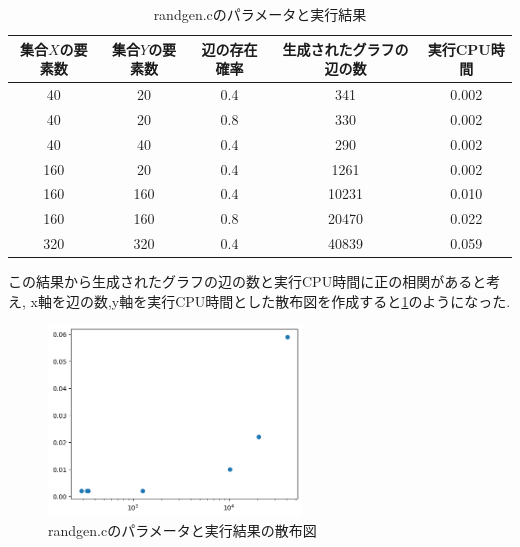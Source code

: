 \documentclass[autodetect-engine, dvi=dvipdfmx, 10pt, a4paper, ja=standard]{bxjsarticle}
\begin{document}
\begin{table}[htbp]
	\centering
	\caption{randgen.cのパラメータと実行結果}
	\label{table:randgen-1}
	\begin{tabular}{@{}ccccc@{}}
		\toprule
		集合$X$の要素数 & 集合$Y$の要素数 & 辺の存在確率 & 生成されたグラフの辺の数 & 実行CPU時間 \\ \midrule
		40        & 20        & 0.4    & 341          & 0.002   \\
		40        & 20        & 0.8    & 330          & 0.002   \\
		40        & 40        & 0.4    & 290          & 0.002   \\
		160       & 20        & 0.4    & 1261         & 0.002   \\
		160       & 160       & 0.4    & 10231        & 0.010   \\
		160       & 160       & 0.8    & 20470        & 0.022   \\
		320       & 320       & 0.4    & 40839        & 0.059   \\ \bottomrule
	\end{tabular}
\end{table}

この結果から生成されたグラフの辺の数と実行CPU時間に正の相関があると考え,
x軸を辺の数,y軸を実行CPU時間とした散布図を作成すると\ref{fig:scatter}のようになった.

\begin{figure}[htbp]
	\centering
	\includegraphics[width=0.6\textwidth]{scat-rand.png}
	\caption{randgen.cのパラメータと実行結果の散布図}
	\label{fig:scatter}
\end{figure}

\end{document}
